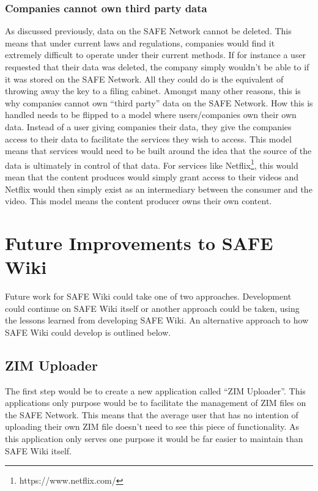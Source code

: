 \subsubsection{Companies cannot own third party data}

As discussed previously, data on the SAFE Network cannot be deleted. This means that under current laws and regulations, companies would find it extremely difficult to operate under their current methods. If for instance a user requested that their data was deleted, the company simply wouldn't be able to if it was stored on the SAFE Network. All they could do is the equivalent of throwing away the key to a filing cabinet. Amongst many other reasons, this is why companies cannot own ``third party'' data on the SAFE Network. How this is handled needs to be flipped to a model where users/companies own their own data. Instead of a user giving companies their data, they give the companies access to their data to facilitate the services they wish to access. This model means that services would need to be built around the idea that the source of the data is ultimately in control of that data. For services like Netflix\footnote{https://www.netflix.com/}, this would mean that the content produces would simply grant access to their videos and Netflix would then simply exist as an intermediary between the consumer and the video. This model means the content producer owns their own content.

\section{Future Improvements to SAFE Wiki}

Future work for SAFE Wiki could take one of two approaches. Development could continue on SAFE Wiki itself or another approach could be taken, using the lessons learned from developing SAFE Wiki. An alternative approach to how SAFE Wiki could develop is outlined below.

\subsection{ZIM Uploader}

The first step would be to create a new application called ``ZIM Uploader''. This applications only purpose would be to facilitate the management of ZIM files on the SAFE Network. This means that the average user that has no intention of uploading their own ZIM file doesn't need to see this piece of functionality. As this application only serves one purpose it would be far easier to maintain than SAFE Wiki itself.

